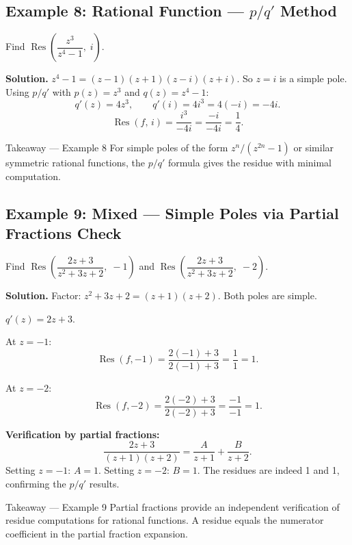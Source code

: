 \documentclass[12pt,a4paper]{article}
\begin{document}
\subsection*{Example 8: Rational Function --- $p/q'$ Method}

Find $\operatorname{Res}\!\left(\dfrac{z^3}{z^4-1},\; i\right)$.

\textbf{Solution.}
$z^4 - 1 = (z-1)(z+1)(z-i)(z+i)$.  So $z = i$ is a simple pole.
Using $p/q'$ with $p(z) = z^3$ and $q(z) = z^4 - 1$:
\[
   q'(z) = 4z^3, \qquad q'(i) = 4i^3 = 4(-i) = -4i.
\]
\[
   \operatorname{Res}(f,\, i) = \frac{i^3}{-4i} = \frac{-i}{-4i} = \frac{1}{4}.
\]

\begin{learnbox}{Takeaway --- Example 8}
For simple poles of the form $z^n/(z^{2n}-1)$ or similar symmetric rational functions, the
$p/q'$ formula gives the residue with minimal computation.
\end{learnbox}

\subsection*{Example 9: Mixed --- Simple Poles via Partial Fractions Check}

Find $\operatorname{Res}\!\left(\dfrac{2z+3}{z^2+3z+2},\; -1\right)$ and
$\operatorname{Res}\!\left(\dfrac{2z+3}{z^2+3z+2},\; -2\right)$.

\textbf{Solution.}
Factor: $z^2+3z+2 = (z+1)(z+2)$.  Both poles are simple.

$q'(z) = 2z+3$.

At $z = -1$:
\[
   \operatorname{Res}(f,-1) = \frac{2(-1)+3}{2(-1)+3} = \frac{1}{1} = 1.
\]

At $z = -2$:
\[
   \operatorname{Res}(f,-2) = \frac{2(-2)+3}{2(-2)+3} = \frac{-1}{-1} = 1.
\]

\textbf{Verification by partial fractions:}
\[
   \frac{2z+3}{(z+1)(z+2)} = \frac{A}{z+1} + \frac{B}{z+2}.
\]
Setting $z=-1$: $A = 1$.  Setting $z=-2$: $B = 1$.
The residues are indeed 1 and 1, confirming the $p/q'$ results. \checkmark

\begin{learnbox}{Takeaway --- Example 9}
Partial fractions provide an independent verification of residue computations for rational functions.
A residue equals the numerator coefficient in the partial fraction expansion.
\end{learnbox}
\end{document}

